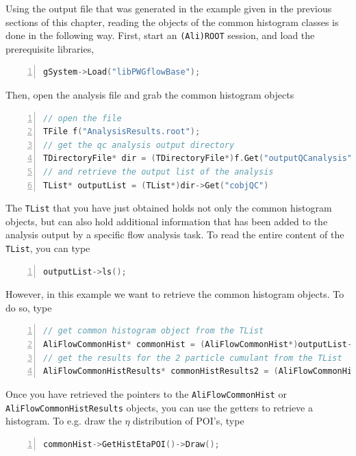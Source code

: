 \documentclass[a4paper]{book}
\numberwithin{equation}{subsection}
\begin{document}
Using the output file that was generated in the example given in the previous sections of this chapter, reading the objects of the common histogram classes is done in the following way. First, start an \texttt{(Ali)ROOT} session, and load the prerequisite libraries,
\begin{lstlisting}[language=C, numbers=left]
gSystem->Load("libPWGflowBase");\end{lstlisting}
Then, open the analysis file and grab the common histogram objects
\begin{lstlisting}[language=C, numbers=left]
// open the file
TFile f("AnalysisResults.root");
// get the qc analysis output directory
TDirectoryFile* dir = (TDirectoryFile*)f.Get("outputQCanalysis");
// and retrieve the output list of the analysis
TList* outputList = (TList*)dir->Get("cobjQC")\end{lstlisting}
The \texttt{TList} that you have just obtained holds not only the common histogram objects, but can also hold additional information that has been added to the analysis output by a specific flow analysis task. To read the entire content of the \texttt{TList}, you can type
\begin{lstlisting}[language=C, numbers=left]
outputList->ls();\end{lstlisting}
However, in this example we want to retrieve the common histogram objects. To do so, type
\begin{lstlisting}[language=C, numbers=left]
// get common histogram object from the TList
AliFlowCommonHist* commonHist = (AliFlowCommonHist*)outputList->FindObject("AliFlowCommonHistQC");
// get the results for the 2 particle cumulant from the TList
AliFlowCommonHistResults* commonHistResults2 = (AliFlowCommonHistResults*)outputList->FindObject("AliFlowCommonHistResults2ndOrderQC");\end{lstlisting}
Once you have retrieved the pointers to the \texttt{AliFlowCommonHist} or \texttt{AliFlowCommonHistResults} objects, you can use the getters to retrieve a histogram. To e.g. draw the $\eta$ distribution of POI's, type
\begin{lstlisting}[language=C, numbers=left]
 commonHist->GetHistEtaPOI()->Draw();\end{lstlisting}
 
\end{document}

